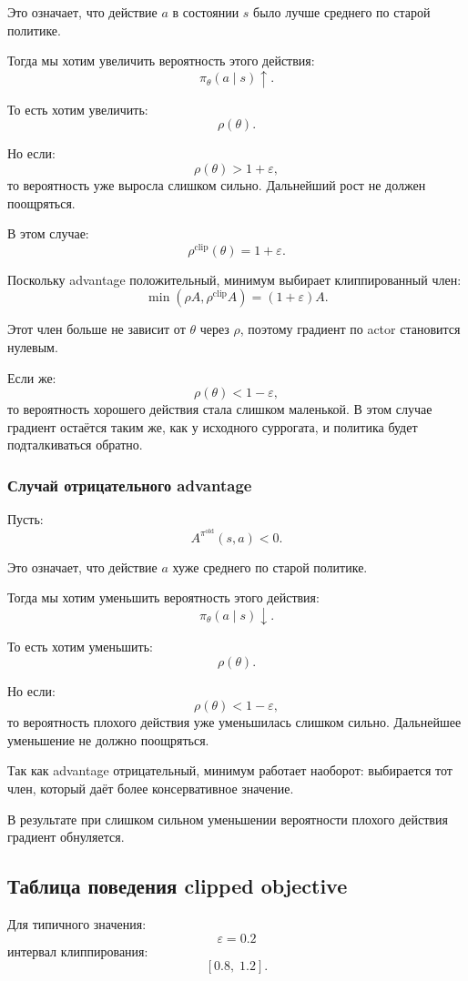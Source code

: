 \documentclass[12pt,a4paper]{article}
\begin{document}
Это означает, что действие $a$ в состоянии $s$ было лучше среднего по старой политике.

Тогда мы хотим увеличить вероятность этого действия:
\[
\pi_\theta(a\mid s)\uparrow.
\]

То есть хотим увеличить:
\[
\rho(\theta).
\]

Но если:
\[
\rho(\theta)>1+\varepsilon,
\]
то вероятность уже выросла слишком сильно. Дальнейший рост не должен поощряться.

В этом случае:
\[
\rho^{\mathrm{clip}}(\theta)=1+\varepsilon.
\]

Поскольку advantage положительный, минимум выбирает клиппированный член:
\[
\min
\left(
\rho A,
\rho^{\mathrm{clip}}A
\right)
=
(1+\varepsilon)A.
\]

Этот член больше не зависит от $\theta$ через $\rho$, поэтому градиент по actor становится нулевым.

Если же:
\[
\rho(\theta)<1-\varepsilon,
\]
то вероятность хорошего действия стала слишком маленькой. В этом случае градиент остаётся таким же, как у исходного суррогата, и политика будет подталкиваться обратно.

\subsubsection{Случай отрицательного advantage}

Пусть:
\[
A^{\pi^{\mathrm{old}}}(s,a)<0.
\]

Это означает, что действие $a$ хуже среднего по старой политике.

Тогда мы хотим уменьшить вероятность этого действия:
\[
\pi_\theta(a\mid s)\downarrow.
\]

То есть хотим уменьшить:
\[
\rho(\theta).
\]

Но если:
\[
\rho(\theta)<1-\varepsilon,
\]
то вероятность плохого действия уже уменьшилась слишком сильно. Дальнейшее уменьшение не должно поощряться.

Так как advantage отрицательный, минимум работает наоборот: выбирается тот член, который даёт более консервативное значение.

В результате при слишком сильном уменьшении вероятности плохого действия градиент обнуляется.

\subsection{Таблица поведения clipped objective}

Для типичного значения:
\[
\varepsilon=0.2
\]
интервал клиппирования:
\[
[0.8,\;1.2].
\]
\end{document}
